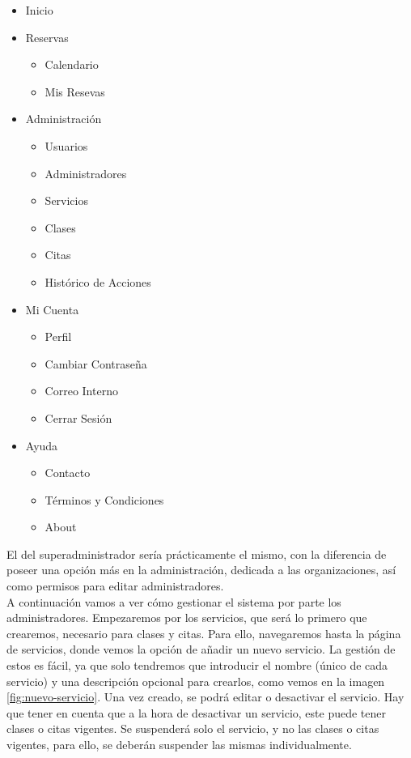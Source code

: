 \begin{itemize}
\item Inicio
\item Reservas

\begin{itemize}
\item Calendario
\item Mis Resevas
\end{itemize}

\item Administración

\begin{itemize}
\item Usuarios
\item Administradores
\item Servicios
\item Clases
\item Citas
\item Histórico de Acciones
\end{itemize}

\item Mi Cuenta

\begin{itemize}
\item Perfil
\item Cambiar Contraseña
\item Correo Interno
\item Cerrar Sesión
\end{itemize}

\item Ayuda

\begin{itemize}
\item Contacto
\item Términos y Condiciones
\item About
\end{itemize}

\end{itemize}

El del superadministrador sería prácticamente el mismo, con la diferencia de poseer una opción más en la administración, dedicada a las organizaciones, así como permisos para editar administradores.\\

A continuación vamos a ver cómo gestionar el sistema por parte los administradores. Empezaremos por los servicios, que será lo primero que crearemos, necesario para clases y citas. Para ello, navegaremos hasta la página de servicios, donde vemos la opción de añadir un nuevo servicio. La gestión de estos es fácil, ya que solo tendremos que introducir el nombre (único de cada servicio) y una descripción opcional para crearlos, como vemos en la imagen \ref{fig:nuevo-servicio}. Una vez creado, se podrá editar o desactivar el servicio. Hay que tener en cuenta que a la hora de desactivar un servicio, este puede tener clases o citas vigentes. Se suspenderá solo el servicio, y no las clases o citas vigentes, para ello, se deberán suspender las mismas individualmente. 

